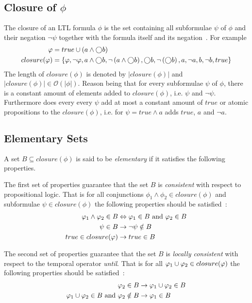 \subsection{Closure of $\phi$}
The closure of an LTL formula $\phi$ is the set containing all subformulae $\psi$ of $\phi$ and their negation $\lnot \psi$ together with the formula itself and its negation~\cite[p.~276, def. 5.34]{baier2008principles}. For example
\begin{align*}
    \varphi &= true \cup \left( a \land \bigcirc b \right) \\
    closure(\varphi) &= \left\{ \varphi, \lnot \varphi, a \land \bigcirc b, \lnot \left( a \land \bigcirc b \right), \bigcirc b, \lnot \left( \bigcirc b \right), a, \lnot a, b, \lnot b, true \right\}
\end{align*}
The length of $closure(\phi)$ is denoted by $|closure(\phi)|$ and $|closure(\phi)| \in \mathcal{O}\left(|\phi|\right)$. Reason being that for every subformulae $\psi$ of $\phi$, there is a constant amount of elements added to $closure(\phi)$, i.e. $\psi$ and $\lnot \psi$. Furthermore does every every $\psi$ add at most a constant amount of $true$ or atomic propositions to the $closure(\phi)$, i.e. for $\psi = true \land a$ adds $true$, $a$ and $\lnot a$.

\subsection{Elementary Sets}
\label{sec:elemesets}
A set $B \subseteq closure(\phi)$ is said to be \emph{elementary} if it satisfies the following properties.

The first set of properties guarantee that the set $B$ is \emph{consistent} with respect to propositional logic. That is for all conjunctions $\phi_1 \land \phi_2 \in closure(\phi)$ and subformulae $\psi \in closure(\phi)$ the following properties should be satisfied~\cite{baier2008principles}:
\begin{align}
    \varphi_1 \land \varphi_2 \in B &\Leftrightarrow \varphi_1 \in B \text{ and } \varphi_2 \in B \label{eq:elem1.1} \\
    \psi \in B &\rightarrow \lnot \psi \notin B \label{eq:elem1.2} \\
    true \in closure(\varphi) &\rightarrow true \in B \label{eq:elem1.3}
\end{align}

The second set of properties guarantee that the set $B$ is \emph{locally consistent} with respect to the temporal operator \emph{until}. That is for all $\varphi_1 \cup \varphi_2 \in closure(\varphi)$ the following properties should be satisfied~\cite{baier2008principles}:
\begin{align}
    \varphi_2 \in B &\rightarrow \varphi_1 \cup \varphi_2 \in B \label{eq:elem2.1} \\
    \varphi_1 \cup \varphi_2 \in B \text{ and } \varphi_2 \notin B &\rightarrow \varphi_1 \in B \label{eq:elem2.2}
\end{align}


